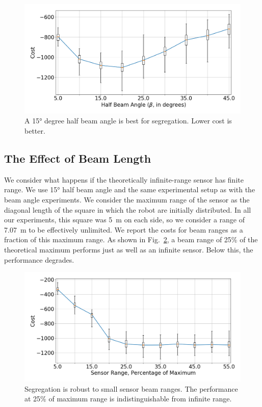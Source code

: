 \documentclass[letterpaper, 10 pt, conference]{ieeeconf}
\begin{document}
\begin{figure}[t]
  \centering
  \includegraphics[width=0.9\linewidth]{./images/beam_angle}
  \caption{A \ang{15} degree half beam angle is best for segregation. Lower cost is better.}
  \label{fig:beam_angle}
\end{figure}

\subsection{The Effect of Beam Length} \label{section:beam_range}

We consider what happens if the theoretically infinite-range sensor has finite
range. We use \ang{15} half beam angle and the same experimental setup as with
the beam angle experiments. We consider the maximum range of the sensor as the
diagonal length of the square in which the robot are initially distributed. In
all our experiments, this square was \SI{5}{\meter} on each side, so we consider
a range of \SI{7.07}{\meter} to be effectively unlimited. We report the costs
for beam ranges as a fraction of this maximum range. As shown in
Fig.~\ref{fig:beam_range}, a beam range of 25\% of the theoretical maximum
performs just as well as an infinite sensor. Below this, the performance
degrades.

\begin{figure}[t]
  \centering
  \includegraphics[width=0.9\linewidth]{./images/beam_length}
  \caption{Segregation is robust to small sensor beam ranges. The performance at 25\% of maximum range is indistinguishable from infinite range.}
  \label{fig:beam_range}
\end{figure}
\end{document}
